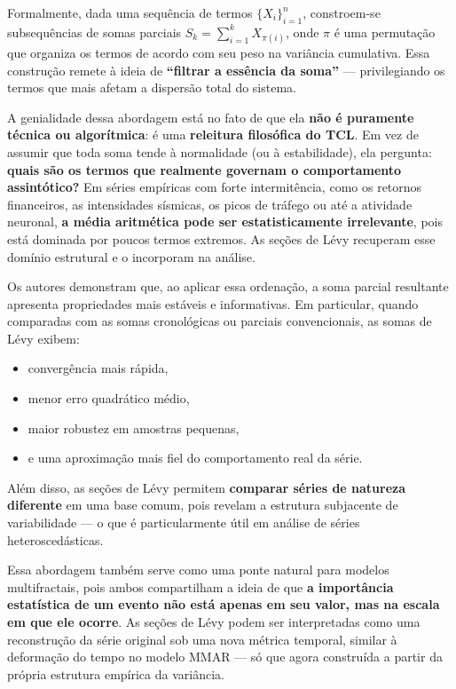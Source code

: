 \documentclass[
  portuguese,
]{agujournal2019}
\providecommand{\tightlist}{%
  \setlength{\itemsep}{0pt}\setlength{\parskip}{0pt}}
\begin{document}
Formalmente, dada uma sequência de termos \(\{X_i\}_{i=1}^n\),
constroem-se subsequências de somas parciais
\(S_k = \sum_{i=1}^k X_{\pi(i)}\), onde \(\pi\) é uma permutação que
organiza os termos de acordo com seu peso na variância cumulativa. Essa
construção remete à ideia de \textbf{``filtrar a essência da soma''} ---
privilegiando os termos que mais afetam a dispersão total do sistema.

A genialidade dessa abordagem está no fato de que ela \textbf{não é
puramente técnica ou algorítmica}: é uma \textbf{releitura filosófica do
TCL}. Em vez de assumir que toda soma tende à normalidade (ou à
estabilidade), ela pergunta: \textbf{quais são os termos que realmente
governam o comportamento assintótico?} Em séries empíricas com forte
intermitência, como os retornos financeiros, as intensidades sísmicas,
os picos de tráfego ou até a atividade neuronal, \textbf{a média
aritmética pode ser estatisticamente irrelevante}, pois está dominada
por poucos termos extremos. As seções de Lévy recuperam esse domínio
estrutural e o incorporam na análise.

Os autores demonstram que, ao aplicar essa ordenação, a soma parcial
resultante apresenta propriedades mais estáveis e informativas. Em
particular, quando comparadas com as somas cronológicas ou parciais
convencionais, as somas de Lévy exibem:

\begin{itemize}
\tightlist
\item
  convergência mais rápida,
\item
  menor erro quadrático médio,
\item
  maior robustez em amostras pequenas,
\item
  e uma aproximação mais fiel do comportamento real da série.
\end{itemize}

Além disso, as seções de Lévy permitem \textbf{comparar séries de
natureza diferente} em uma base comum, pois revelam a estrutura
subjacente de variabilidade --- o que é particularmente útil em análise
de séries heteroscedásticas.

Essa abordagem também serve como uma ponte natural para modelos
multifractais, pois ambos compartilham a ideia de que \textbf{a
importância estatística de um evento não está apenas em seu valor, mas
na escala em que ele ocorre}. As seções de Lévy podem ser interpretadas
como uma reconstrução da série original sob uma nova métrica temporal,
similar à deformação do tempo no modelo MMAR --- só que agora construída
a partir da própria estrutura empírica da variância.
\end{document}
